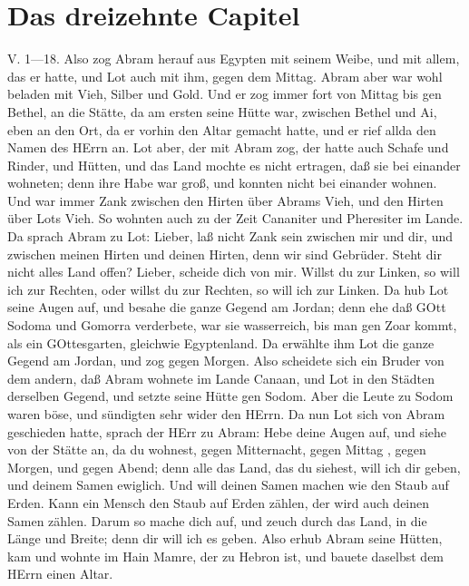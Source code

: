 \section{Das dreizehnte Capitel}

\begin{schriftzitat}
V. 1—18. Also zog Abram herauf aus Egypten mit seinem Weibe, und mit allem, das er hatte, und Lot auch mit ihm, gegen dem Mittag. Abram aber war wohl beladen mit Vieh, Silber und Gold. Und er zog immer fort von Mittag bis gen Bethel, an die Stätte, da am ersten seine Hütte war, zwischen Bethel und Ai, eben an den Ort, da er vorhin den Altar gemacht hatte, und er rief allda den Namen des HErrn an. Lot aber, der mit Abram zog, der hatte auch Schafe und Rinder, und Hütten, und das Land mochte es nicht ertragen, daß sie bei einander wohneten; denn ihre Habe war groß, und konnten nicht bei einander wohnen. Und war immer Zank zwischen den Hirten über Abrams Vieh, und den Hirten über Lots Vieh. So wohnten auch zu der Zeit Cananiter und Pheresiter im Lande. Da sprach Abram zu Lot: Lieber, laß nicht Zank sein zwischen mir und dir, und zwischen meinen Hirten und deinen Hirten, denn wir sind Gebrüder. Steht dir nicht alles Land offen? Lieber, scheide dich von mir. Willst du zur Linken, so will ich zur Rechten, oder willst du zur Rechten, so will ich zur Linken. Da hub Lot seine Augen auf, und besahe die ganze Gegend am Jordan; denn ehe daß GOtt Sodoma und Gomorra verderbete, war sie wasserreich, bis man gen Zoar kommt, als ein GOttesgarten, gleichwie Egyptenland. Da erwählte ihm Lot die ganze Gegend am Jordan, und zog gegen Morgen. Also scheidete sich ein Bruder von dem andern, daß Abram wohnete im Lande Canaan, und Lot in den Städten derselben Gegend, und setzte seine Hütte gen Sodom. Aber die Leute zu Sodom waren böse, und sündigten sehr wider den HErrn. Da nun Lot sich von Abram geschieden hatte, sprach der HErr zu Abram: Hebe deine Augen auf, und siehe von der Stätte an, da du wohnest, gegen Mitternacht, gegen Mittag
, gegen Morgen, und gegen Abend; denn alle das Land, das du siehest, will ich dir geben, und deinem Samen ewiglich. Und will deinen Samen machen wie den Staub auf Erden. Kann ein Mensch den Staub auf Erden zählen, der wird auch deinen Samen zählen. Darum so mache dich auf, und zeuch durch das Land, in die Länge und Breite; denn dir will ich es geben. Also erhub Abram seine Hütten, kam und wohnte im Hain Mamre, der zu Hebron ist, und bauete daselbst dem HErrn einen Altar.
\end{schriftzitat}

